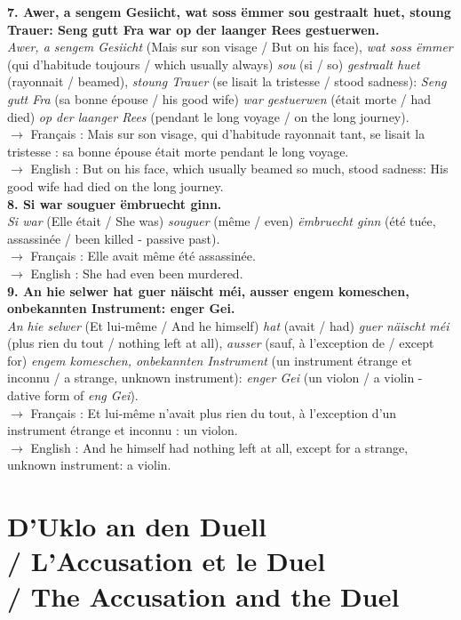 \textbf{7. Awer, a sengem Gesiicht, wat soss ëmmer sou gestraalt huet, stoung Trauer: Seng gutt Fra war op der laanger Rees gestuerwen.}\\
\textit{Awer, a sengem Gesiicht} (Mais sur son visage / But on his face), \textit{wat soss ëmmer} (qui d'habitude toujours / which usually always) \textit{sou} (si / so) \textit{gestraalt huet} (rayonnait / beamed), \textit{stoung Trauer} (se lisait la tristesse / stood sadness): \textit{Seng gutt Fra} (sa bonne épouse / his good wife) \textit{war gestuerwen} (était morte / had died) \textit{op der laanger Rees} (pendant le long voyage / on the long journey).\\
$\rightarrow$ Français : Mais sur son visage, qui d'habitude rayonnait tant, se lisait la tristesse : sa bonne épouse était morte pendant le long voyage.\\
$\rightarrow$ English : But on his face, which usually beamed so much, stood sadness: His good wife had died on the long journey.\\[0.5em]

\textbf{8. Si war souguer ëmbruecht ginn.}\\
\textit{Si war} (Elle était / She was) \textit{souguer} (même / even) \textit{ëmbruecht ginn} (été tuée, assassinée / been killed - passive past).\\
$\rightarrow$ Français : Elle avait même été assassinée.\\
$\rightarrow$ English : She had even been murdered.\\[0.5em]

\textbf{9. An hie selwer hat guer näischt méi, ausser engem komeschen, onbekannten Instrument: enger Gei.}\\
\textit{An hie selwer} (Et lui-même / And he himself) \textit{hat} (avait / had) \textit{guer näischt méi} (plus rien du tout / nothing left at all), \textit{ausser} (sauf, à l'exception de / except for) \textit{engem komeschen, onbekannten Instrument} (un instrument étrange et inconnu / a strange, unknown instrument): \textit{enger Gei} (un violon / a violin - dative form of \textit{eng Gei}).\\
$\rightarrow$ Français : Et lui-même n'avait plus rien du tout, à l'exception d'un instrument étrange et inconnu : un violon.\\
$\rightarrow$ English : And he himself had nothing left at all, except for a strange, unknown instrument: a violin.




\section[D'Uklo an den Duell]{D'Uklo an den Duell \\/ L'Accusation et le Duel \\/ The Accusation and the Duel}

